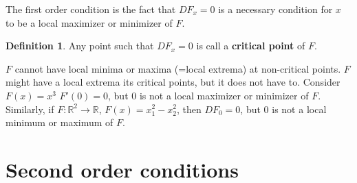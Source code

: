 \documentclass[12pt,reqno]{amsart}
\theoremstyle{definition}
\newtheorem{definition}{Definition}[section]
\def\R{\mathbb{R}}
\renewcommand{\to}{{\rightarrow}}
\begin{document}
The first order condition is the fact that $DF_x = 0$ is a necessary
condition for $x$ to be a local maximizer or minimizer of $F$. 
\begin{definition}
  Any point such that $DF_x = 0$ is call a \textbf{critical point} of
  $F$. 
\end{definition}
$F$ cannot have local minima or maxima (=local extrema) at
non-critical points. $F$ might have a local extrema its critical
points, but it does not have to. Consider $F(x) = x^3$ $F'(0) = 0$,
but $0$ is not a local maximizer or minimizer of $F$. Similarly, if
$F:\R^2 \to \R$, $F(x) = x_1^2 - x_2^2$, then $DF_0 = 0$, but $0$ is
not a local minimum or maximum of $F$. 

\section{Second order conditions}
\end{document}
